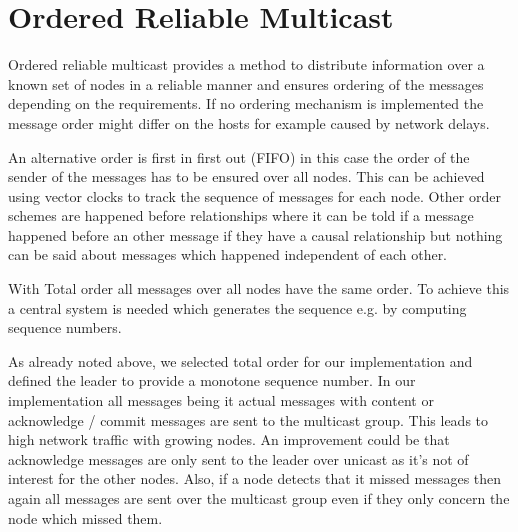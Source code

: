 \section{Ordered Reliable Multicast}\label{sec:OrderedReliableMulticast}
Ordered reliable multicast provides a method to distribute information over a known set of nodes in a reliable manner and ensures ordering of the messages depending on the requirements. 
If no ordering mechanism is implemented the message order might differ on the hosts for example caused by network delays. 

An alternative order is first in first out (FIFO) in this case the order of the sender of the messages has to be ensured over all nodes. This can be achieved using vector clocks to track the sequence of messages for each node. Other order schemes are happened before relationships where it can be told if a message happened before an other message if they have a causal relationship but nothing can be said about messages which happened independent of each other. 

With Total order all messages over all nodes have the same order. To achieve this a central system is needed which generates the sequence e.g. by computing sequence numbers.

As already noted above, we selected total order for our implementation and defined the leader to provide a monotone sequence number. In our implementation all messages being it actual messages with content or acknowledge / commit messages are sent to the multicast group. This leads to high network traffic with growing nodes. An improvement could be that acknowledge messages are only sent to the leader over unicast as it's not of interest for the other nodes. 
Also, if a node detects that it missed messages then again all messages are sent over the multicast group even if they only concern the node which missed them.